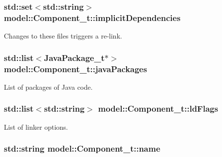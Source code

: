 \subsubsection[{\texorpdfstring{implicit\+Dependencies}{implicitDependencies}}]{\setlength{\rightskip}{0pt plus 5cm}std\+::set$<$std\+::string$>$ model\+::\+Component\+\_\+t\+::implicit\+Dependencies}\hypertarget{structmodel_1_1_component__t_a34151bb82f0cfe3d31aae002e65c690f}{}\label{structmodel_1_1_component__t_a34151bb82f0cfe3d31aae002e65c690f}


Changes to these files triggers a re-\/link. 

\subsubsection[{\texorpdfstring{java\+Packages}{javaPackages}}]{\setlength{\rightskip}{0pt plus 5cm}std\+::list$<${\bf Java\+Package\+\_\+t}$\ast$$>$ model\+::\+Component\+\_\+t\+::java\+Packages}\hypertarget{structmodel_1_1_component__t_a929279910b7134664af23c7e8248aeda}{}\label{structmodel_1_1_component__t_a929279910b7134664af23c7e8248aeda}


List of packages of Java code. 

\subsubsection[{\texorpdfstring{ld\+Flags}{ldFlags}}]{\setlength{\rightskip}{0pt plus 5cm}std\+::list$<$std\+::string$>$ model\+::\+Component\+\_\+t\+::ld\+Flags}\hypertarget{structmodel_1_1_component__t_ab5721bf032cc10f21770ce555f27aa44}{}\label{structmodel_1_1_component__t_ab5721bf032cc10f21770ce555f27aa44}


List of linker options. 

\subsubsection[{\texorpdfstring{name}{name}}]{\setlength{\rightskip}{0pt plus 5cm}std\+::string model\+::\+Component\+\_\+t\+::name}\hypertarget{structmodel_1_1_component__t_a66a236fad1cd7d1e8e3fee94fbdcad39}{}\label{structmodel_1_1_component__t_a66a236fad1cd7d1e8e3fee94fbdcad39}


